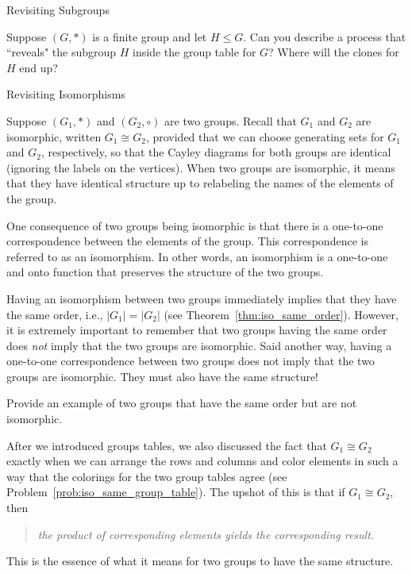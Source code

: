 \begin{section}{Revisiting Subgroups}
\begin{problem}
Suppose $(G,*)$ is a finite group and let $H\leq G$.  Can you describe a process that ``reveals" the subgroup $H$ inside the group table for $G$?  Where will the clones for $H$ end up?
\end{problem}

\end{section}

\begin{section}{Revisiting Isomorphisms}

Suppose $(G_1,*)$ and $(G_2,\circ)$ are two groups.  Recall that $G_1$ and $G_2$ are isomorphic, written $G_1\cong G_2$, provided that we can choose generating sets for $G_1$ and $G_2$, respectively, so that the Cayley diagrams for both groups are identical (ignoring the labels on the vertices).  When two groups are isomorphic, it means that they have identical structure up to relabeling the names of the elements of the group.

One consequence of two groups being isomorphic is that there is a one-to-one correspondence between the elements of the group.  This correspondence is referred to as an isomorphism.  In other words, an isomorphism is a one-to-one and onto function that preserves the structure of the two groups.  

Having an isomorphism between two groups immediately implies that they have the same order, i.e., $|G_1|=|G_2|$ (see Theorem~\ref{thm:iso_same_order}).  However, it is extremely important to remember that two groups having the same order does \emph{not} imply that the two groups are isomorphic.  Said another way, having a one-to-one correspondence between two groups does not imply that the two groups are isomorphic.  They must also have the same structure!

\begin{exercise}
Provide an example of two groups that have the same order but are not isomorphic.
\end{exercise}

After we introduced groups tables, we also discussed the fact that $G_1\cong G_2$ exactly when we can arrange the rows and columns and color elements in such a way that the colorings for the two group tables agree (see Problem~\ref{prob:iso_same_group_table}).  The upshot of this is that if $G_1\cong G_2$, then
\begin{quotation}
\emph{the product of corresponding elements yields the corresponding result.}
\end{quotation}
This is the essence of what it means for two groups to have the same structure.  


\end{section}
